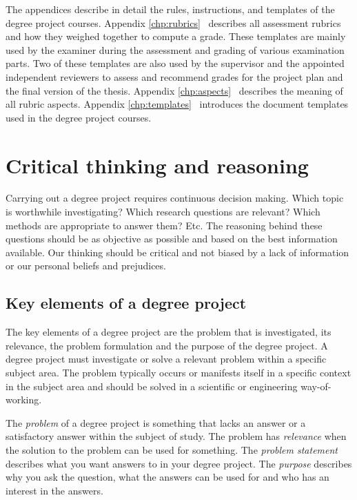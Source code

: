 \documentclass[a4paper,12pt]{book}
\begin{document}
The appendices describe in detail the
rules, instructions, and templates of the degree project courses. Appendix \ref{chp:rubrics}~\emph{} describes all assessment rubrics and how they weighed together to compute a grade. These templates are
mainly used by the examiner during the assessment and grading of various
examination parts. Two of these templates are also used by the supervisor
and the appointed independent reviewers to assess and recommend grades for
the project plan and the final version of the thesis. Appendix \ref{chp:aspects}~\emph{} describes the meaning of all rubric aspects. Appendix \ref{chp:templates}~\emph{} introduces the document templates used in the degree project courses.



\chapter{Critical thinking and reasoning}
\label{chp:reasoning}
Carrying out a degree project requires continuous decision making.
Which topic is worthwhile investigating? Which research questions
are relevant? Which methods are appropriate to answer them? Etc.
The reasoning behind these questions should be as objective
as possible and based on the best information available.
Our thinking should be critical and not biased by a lack of information
or our personal beliefs and prejudices.

\section{Key elements of a degree project}
The key elements of a degree project are the problem that is investigated, its relevance,
the problem formulation and the purpose of the degree project.
A degree project must investigate or solve a relevant problem within a specific subject area.
The problem typically occurs or manifests itself in a specific context in the subject area and should be solved in a scientific or engineering way-of-working.

The \emph{problem} of a degree project is something that lacks an answer or a satisfactory answer within the subject of study.
The problem has \emph{relevance} when the solution to the problem can be used for something.
The \emph{problem statement} describes what you want answers to in your degree project.
The \emph{purpose} describes why you ask the question, what the answers can be used for and who has an interest in the answers.
\end{document}

